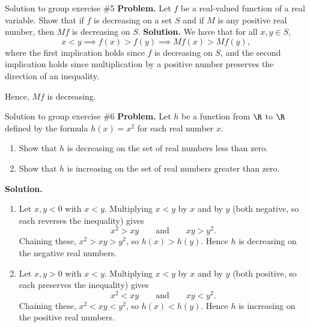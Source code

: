 \documentclass[10pt]{beamer}
\begin{document}
\begin{frame}{Solution to group exercise \#5}
\textbf{Problem.} Let $f$ be a real-valued function of a real variable. Show that if $f$ is decreasing on a set $S$ and if $M$ is any positive real number, then $Mf$ is decreasing on $S$.
\vfill 
\textbf{Solution.} We have that for all $x,y \in S$,
\[ x < y \implies f(x) > f(y) \implies Mf(x) > Mf(y),\]
where the first implication holds since $f$ is decreasing on $S$, and the second implication holds since multiplication by a positive number preserves the direction of an inequality.

Hence, $Mf$ is decreasing.
\end{frame}

\begin{frame}{Solution to group exercise \#6}
\textbf{Problem.} Let $h$ be a function from $\R$ to $\R$ defined by the formula $h(x) =x^2$ for each real number $x$.
	\begin{enumerate} \footnotesize 
	\item[a.] Show that $h$ is decreasing on the set of real numbers less than zero.
	\item[b.]  Show that $h$ is increasing on the set of real numbers greater than zero.
	\end{enumerate}

\vfill 
\textbf{Solution.}	
	\begin{enumerate} \footnotesize 
	\item[a.] Let $x,y <0$ with $x<y$. Multiplying $x<y$ by $x$ and by $y$ (both negative, so each reverses the inequality) gives
\[ x^2 > xy \qquad \text{and} \qquad xy > y^2. \]
Chaining these, $x^2 > xy > y^2$, so $h(x) > h(y)$. Hence $h$ is decreasing on the negative real numbers.
	\item[b.] Let $x,y >0$ with $x<y$. Multiplying $x<y$ by $x$ and by $y$ (both positive, so each preserves the inequality) gives
\[ x^2 < xy \qquad \text{and} \qquad xy < y^2. \]
Chaining these, $x^2 < xy < y^2$, so $h(x) < h(y)$. Hence $h$ is increasing on the positive real numbers.

	\end{enumerate}
\end{frame}
\end{document}
